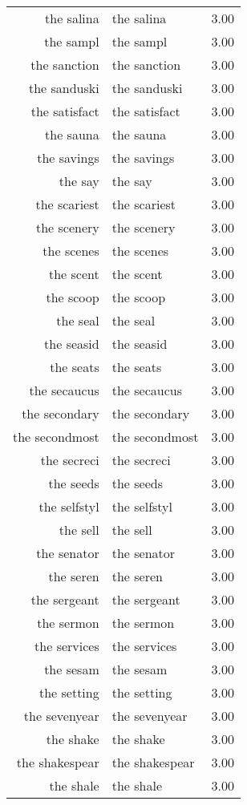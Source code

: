 \begin{table}[ht]
\begin{tabular}{rlr}
  the salina & the salina & 3.00 \\ 
  the sampl & the sampl & 3.00 \\ 
  the sanction & the sanction & 3.00 \\ 
  the sanduski & the sanduski & 3.00 \\ 
  the satisfact & the satisfact & 3.00 \\ 
  the sauna & the sauna & 3.00 \\ 
  the savings & the savings & 3.00 \\ 
  the say & the say & 3.00 \\ 
  the scariest & the scariest & 3.00 \\ 
  the scenery & the scenery & 3.00 \\ 
  the scenes & the scenes & 3.00 \\ 
  the scent & the scent & 3.00 \\ 
  the scoop & the scoop & 3.00 \\ 
  the seal & the seal & 3.00 \\ 
  the seasid & the seasid & 3.00 \\ 
  the seats & the seats & 3.00 \\ 
  the secaucus & the secaucus & 3.00 \\ 
  the secondary & the secondary & 3.00 \\ 
  the secondmost & the secondmost & 3.00 \\ 
  the secreci & the secreci & 3.00 \\ 
  the seeds & the seeds & 3.00 \\ 
  the selfstyl & the selfstyl & 3.00 \\ 
  the sell & the sell & 3.00 \\ 
  the senator & the senator & 3.00 \\ 
  the seren & the seren & 3.00 \\ 
  the sergeant & the sergeant & 3.00 \\ 
  the sermon & the sermon & 3.00 \\ 
  the services & the services & 3.00 \\ 
  the sesam & the sesam & 3.00 \\ 
  the setting & the setting & 3.00 \\ 
  the sevenyear & the sevenyear & 3.00 \\ 
  the shake & the shake & 3.00 \\ 
  the shakespear & the shakespear & 3.00 \\ 
  the shale & the shale & 3.00 \\ 

\end{tabular}
\end{table}
